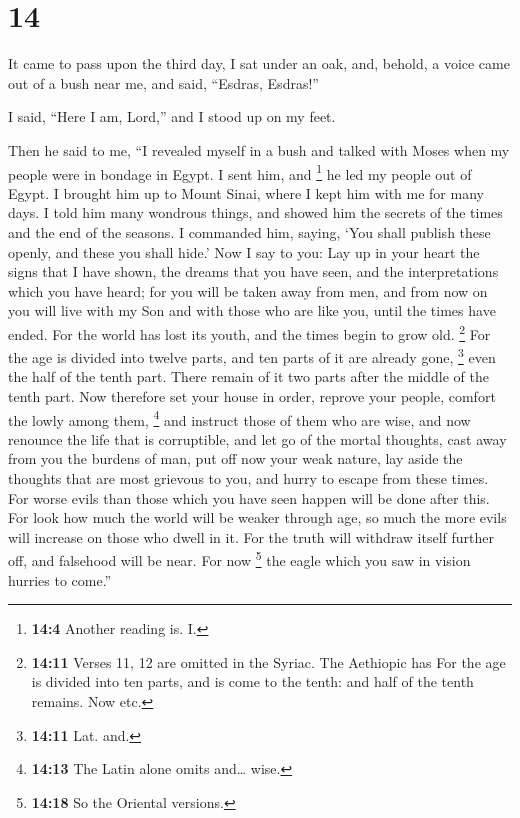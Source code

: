 \hypertarget{section-13}{%
\section{14}\label{section-13}}

 It came to pass upon the third day, I sat under an oak,
and, behold, a voice came out of a bush near me, and said, ``Esdras,
Esdras!''

 I said, ``Here I am, Lord,'' and I stood up on my feet.

 Then he said to me, ``I revealed myself in a bush and
talked with Moses when my people were in bondage in Egypt.
 I sent him, and \footnote{\textbf{14:4} Another reading
  is. I.} he led my people out of Egypt. I brought him up to Mount
Sinai, where I kept him with me for many days.  I told him
many wondrous things, and showed him the secrets of the times and the
end of the seasons. I commanded him, saying,  `You shall
publish these openly, and these you shall hide.'  Now I
say to you:  Lay up in your heart the signs that I have
shown, the dreams that you have seen, and the interpretations which you
have heard;  for you will be taken away from men, and from
now on you will live with my Son and with those who are like you, until
the times have ended.  For the world has lost its youth,
and the times begin to grow old.  \footnote{\textbf{14:11}
  Verses 11, 12 are omitted in the Syriac. The Aethiopic has For the age
  is divided into ten parts, and is come to the tenth: and half of the
  tenth remains. Now etc.} For the age is divided into twelve parts, and
ten parts of it are already gone, \footnote{\textbf{14:11} Lat. and.}
even the half of the tenth part.  There remain of it two
parts after the middle of the tenth part.  Now therefore
set your house in order, reprove your people, comfort the lowly among
them, \footnote{\textbf{14:13} The Latin alone omits and\ldots{} wise.}
and instruct those of them who are wise, and now renounce the life that
is corruptible,  and let go of the mortal thoughts, cast
away from you the burdens of man, put off now your weak nature,
 lay aside the thoughts that are most grievous to you,
and hurry to escape from these times.  For worse evils
than those which you have seen happen will be done after this.
 For look how much the world will be weaker through age,
so much the more evils will increase on those who dwell in it.
 For the truth will withdraw itself further off, and
falsehood will be near. For now \footnote{\textbf{14:18} So the Oriental
  versions.} the eagle which you saw in vision hurries to come.''


